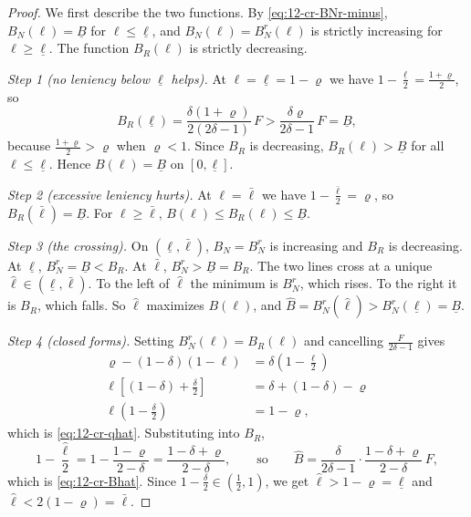 \begin{proof}
We first describe the two functions. By \eqref{eq:12-cr-BNr-minus}, $B_N(\ell) = \underline B$ for
$\ell \le \underline\ell$, and $B_N(\ell) = B_N^r(\ell)$ is strictly increasing for $\ell \ge \underline\ell$. The
function $B_R(\ell)$ is strictly decreasing.

\emph{Step 1 (no leniency below $\underline\ell$ helps).} At $\ell = \underline\ell = 1 - \varrho$ we have
$1 - \frac{\underline\ell}{2} = \frac{1+\varrho}{2}$, so
\begin{equation*}
B_R(\underline\ell) = \frac{\delta(1+\varrho)}{2(2\delta - 1)}\,F > \frac{\delta\varrho}{2\delta - 1}\,F = \underline B,
\end{equation*}
because $\frac{1+\varrho}{2} > \varrho$ when $\varrho < 1$. Since $B_R$ is decreasing, $B_R(\ell) > \underline B$ for
all $\ell \le \underline\ell$. Hence $B(\ell) = \underline B$ on $[0, \underline\ell]$.

\emph{Step 2 (excessive leniency hurts).} At $\ell = \bar\ell$ we have $1 - \frac{\bar\ell}{2} = \varrho$, so
$B_R(\bar\ell) = \underline B$. For $\ell \ge \bar\ell$, $B(\ell) \le B_R(\ell) \le \underline B$.

\emph{Step 3 (the crossing).} On $(\underline\ell, \bar\ell)$, $B_N = B_N^r$ is increasing and $B_R$ is decreasing. At
$\underline\ell$, $B_N^r = \underline B < B_R$. At $\bar\ell$, $B_N^r > \underline B = B_R$. The two lines cross at a
unique $\hat\ell \in (\underline\ell, \bar\ell)$. To the left of $\hat\ell$ the minimum is $B_N^r$, which rises. To
the right it is $B_R$, which falls. So $\hat\ell$ maximizes $B(\ell)$, and $\hat B = B_N^r(\hat\ell) >
B_N^r(\underline\ell) = \underline B$.

\emph{Step 4 (closed forms).} Setting $B_N^r(\ell) = B_R(\ell)$ and cancelling $\frac{F}{2\delta-1}$ gives
\begin{align*}
\varrho - (1-\delta)(1-\ell) &= \delta\left(1 - \frac{\ell}{2}\right)\\
\ell\left[(1-\delta) + \frac{\delta}{2}\right] &= \delta + (1-\delta) - \varrho\\
\ell\left(1 - \frac{\delta}{2}\right) &= 1 - \varrho,
\end{align*}
which is \eqref{eq:12-cr-qhat}. Substituting into $B_R$,
\begin{equation*}
1 - \frac{\hat\ell}{2} = 1 - \frac{1-\varrho}{2-\delta} = \frac{1 - \delta + \varrho}{2 - \delta},
\qquad\text{so}\qquad
\hat B = \frac{\delta}{2\delta - 1}\cdot\frac{1 - \delta + \varrho}{2 - \delta}\,F,
\end{equation*}
which is \eqref{eq:12-cr-Bhat}. Since $1 - \frac{\delta}{2} \in (\frac{1}{2}, 1)$, we get
$\hat\ell > 1 - \varrho = \underline\ell$ and $\hat\ell < 2(1-\varrho) = \bar\ell$.


\end{proof}
